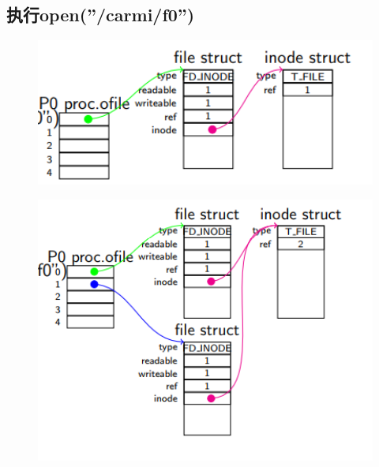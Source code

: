 \documentclass[a4paper,12pt]{report}
\begin{document}
\subsection{ 执行open(”/carmi/f0”)}
\begin{figure}[H]
	\centering
	\includegraphics [width=1.0\textwidth]{figure//image157.png}
\end{figure}
\begin{figure}[H]
	\centering
	\includegraphics [width=1.0\textwidth]{figure//image158.png}
\end{figure}
\end{document}
